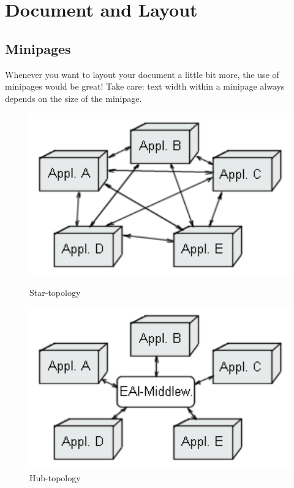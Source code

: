 \documentclass[12pt]{article}
\begin{document}
\section{Document and Layout}
\subsection{Minipages}
Whenever you want to layout your document a little bit more, the use of minipages would be great!
Take care: text width within a minipage always depends on the size of the minipage.
\begin{figure}[here!]
\centering
\begin{minipage}[h]{0.3\textwidth}
\centering
    \includegraphics[width=1.0\textwidth]{images/eai0.png}
    \caption{Star-topology}
    \label{fig:eai0}
\end{minipage}
\begin{minipage}[h]{0.3\textwidth}
\centering
    \includegraphics[width=1.0\textwidth]{images/eai1.png}
    \caption{Hub-topology}

\end{minipage}
\end{figure}
\end{document}
